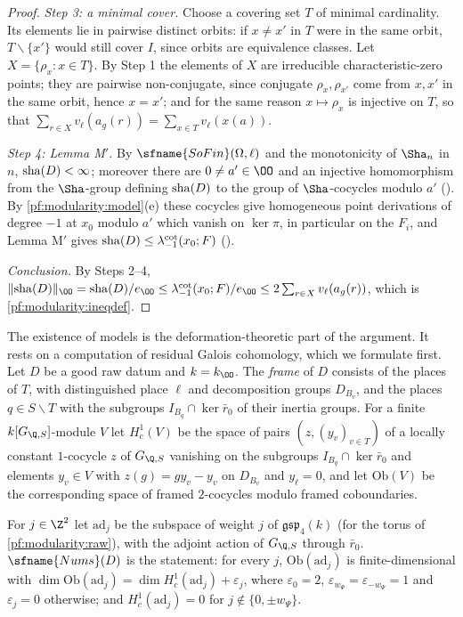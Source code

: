 \begin{proof}
\emph{Step 3: a minimal cover.} Choose a covering set $T$ of minimal cardinality. Its elements lie in pairwise distinct
orbits: if $x\ne x'$ in $T$ were in the same orbit, $T\smallsetminus\{x'\}$ would still cover $I$, since orbits are
equivalence classes. Let $X=\{\rho_x:x\in T\}$. By Step 1 the elements of $X$ are irreducible characteristic-zero
points; they are pairwise non-conjugate, since conjugate $\rho_x,\rho_{x'}$ come from $x,x'$ in the same orbit, hence
$x=x'$; and for the same reason $x\mapsto\rho_x$ is injective on $T$, so that
$\sum_{r\in X}v_\ell(a_g(r))=\sum_{x\in T}v_\ell(x(a))$.

\emph{Step 4: Lemma M$'$.} By $\sfname{SoFin}(\Omega,\ell)$ and the monotonicity of $\Sha_n$ in $n$,
$\mathrm{sha}(D)<\infty$; moreover there are $0\ne a'\in\OO$ and an injective homomorphism from the $\Sha$-group
defining $\mathrm{sha}(D)$ to the group of $\Sha$-cocycles modulo $a'$
(). By \cref{pf:modularity:model}(e) these cocycles give
homogeneous point derivations of degree $-1$ at $x_0$ modulo $a'$ which vanish on $\ker\pi$, in particular on the
$F_i$, and Lemma M$'$ gives $\mathrm{sha}(D)\le\lambda^{\mathrm{cot}}_{-1}(x_0;F)$
().

\emph{Conclusion.} By Steps 2--4,
$\|\modularitySha(D)\|_\OO=\modularitySha(D)/e_\OO\le\modularitycot_{-1}(x_0;F)/e_\OO\le2\sum_{r\in X}v_\ell(a_g(r))$,
which is \eqref{pf:modularity:ineqdef}.
\end{proof}

The existence of models is the deformation-theoretic part of the argument. It rests on a computation of residual Galois
cohomology, which we formulate first. Let $D$ be a good raw datum and $k=k_\OO$. The \emph{frame} of $D$ consists of the
places of $T$, with distinguished place $\ell$ and decomposition groups $D_{B_v}$, and the places $q\in S\smallsetminus T$
with the subgroups $I_{B_q}\cap\ker\bar r_0$ of their inertia groups. For a finite $k[G_{\Q,S}]$-module $V$ let
$H^1_c(V)$ be the space of pairs $(z,(y_v)_{v\in T})$ of a locally constant $1$-cocycle $z$ of $G_{\Q,S}$ vanishing on the
subgroups $I_{B_q}\cap\ker\bar r_0$ and elements $y_v\in V$ with $z(g)=gy_v-y_v$ on $D_{B_v}$ and $y_\ell=0$, and let
$\mathrm{Ob}(V)$ be the corresponding space of framed $2$-cocycles modulo framed coboundaries.

\begin{definition}\label{pf:modularity:numsdef}
For $j\in\Z^2$ let $\mathrm{ad}_j$ be the subspace of weight $j$ of $\mathfrak{gsp}_4(k)$ (for the torus of
\cref{pf:modularity:raw}), with the adjoint action of $G_{\Q,S}$ through $\bar r_0$. $\sfname{Nums}(D)$ is the statement: for
every $j$, $\mathrm{Ob}(\mathrm{ad}_j)$ is finite-dimensional with
$\dim\mathrm{Ob}(\mathrm{ad}_j)=\dim H^1_c(\mathrm{ad}_j)+\varepsilon_j$, where $\varepsilon_0=2$,
$\varepsilon_{w_\Psi}=\varepsilon_{-w_\Psi}=1$ and $\varepsilon_j=0$ otherwise; and $H^1_c(\mathrm{ad}_j)=0$ for
$j\notin\{0,\pm w_\Psi\}$.
\end{definition}

